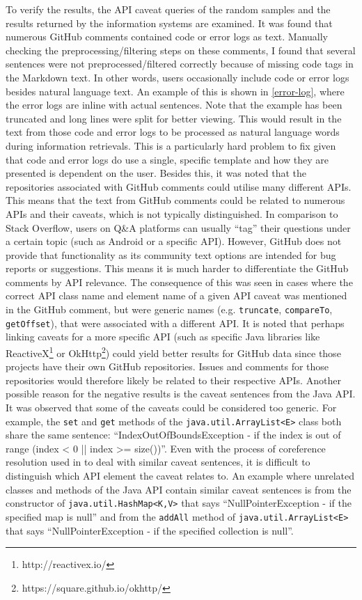 To verify the results, the API caveat queries of the random samples and the results returned by the information systems are examined. It was found that numerous GitHub comments contained code or error logs as text. Manually checking the preprocessing/filtering steps on these comments, I found that several sentences were not preprocessed/filtered correctly because of missing code tags in the Markdown text. In other words, users occasionally include code or error logs besides natural language text. An example of this is shown in \ref{error-log}, where the error logs are inline with actual sentences. Note that the example has been truncated and long lines were split for better viewing. This would result in the text from those code and error logs to be processed as natural language words during information retrievals. This is a particularly hard problem to fix given that code and error logs do use a single, specific template and how they are presented is dependent on the user. Besides this, it was noted that the repositories associated with GitHub comments could utilise many different APIs. This means that the text from GitHub comments could be related to numerous APIs and their caveats, which is not typically distinguished. In comparison to Stack Overflow, users on Q\&A platforms can usually ``tag'' their questions under a certain topic (such as Android or a specific API). However, GitHub does not provide that functionality as its community text options are intended for bug reports or suggestions. This means it is much harder to differentiate the GitHub comments by API relevance. The consequence of this was seen in cases where the correct API class name and element name of a given API caveat was mentioned in the GitHub comment, but were generic names (e.g. \lstinline{truncate}, \lstinline{compareTo}, \lstinline{getOffset}), that were associated with a different API. It is noted that perhaps linking caveats for a more specific API (such as specific Java libraries like ReactiveX\footnote{http://reactivex.io/} or OkHttp\footnote{https://square.github.io/okhttp/}) could yield better results for GitHub data since those projects have their own GitHub repositories. Issues and comments for those repositories would therefore likely be related to their respective APIs. Another possible reason for the negative results is the caveat sentences from the Java API. It was observed that some of the caveats could be considered too generic. For example, the \lstinline{set} and \lstinline{get} methods of the \lstinline{java.util.ArrayList<E>} class both share the same sentence: ``IndexOutOfBoundsException - if the index is out of range (index < 0 || index >= size())''. Even with the process of coreference resolution used in \cite{jiamou} to deal with similar caveat sentences, it is difficult to distinguish which API element the caveat relates to.
An example where unrelated classes and methods of the Java API contain similar caveat sentences is from the constructor of \lstinline{java.util.HashMap<K,V>} that says ``NullPointerException - if the specified map is null'' and from the \lstinline{addAll} method of \lstinline{java.util.ArrayList<E>} that says ``NullPointerException - if the specified collection is null''. \\

